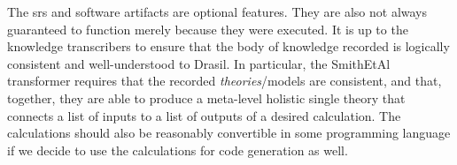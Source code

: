 


The \acs{srs} and software artifacts are optional features. They are also not
always guaranteed to function merely because they were executed. It is up to the
knowledge transcribers to ensure that the body of knowledge recorded is
logically consistent and well-understood to Drasil. In particular, the SmithEtAl
transformer requires that the recorded \textit{theories}/models are consistent,
and that, together, they are able to produce a meta-level holistic single theory
that connects a list of inputs to a list of outputs of a desired calculation.
The calculations should also be reasonably convertible in some programming
language if we decide to use the calculations for code generation as well.


\caseStudiesCodeTable


